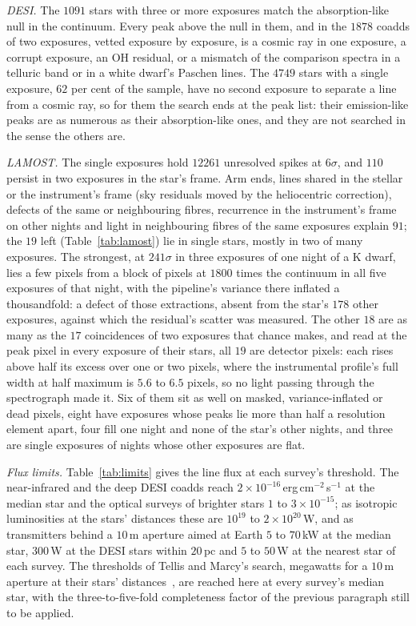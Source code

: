 \documentclass[3p,11pt]{elsarticle}
\begin{document}
\emph{DESI.} The $1091$ stars with three or more exposures match the absorption-like null
in the continuum. Every peak above the null in them, and in the $1878$ coadds of two
exposures, vetted exposure by exposure, is a cosmic ray in one exposure, a corrupt
exposure, an OH residual, or a mismatch of the comparison spectra in a telluric band or
in a white dwarf's Paschen lines. The $4749$ stars with a single exposure, $62$ per cent
of the sample, have no second exposure to separate a line from a cosmic ray, so for them
the search ends at the peak list: their emission-like peaks are as numerous as their
absorption-like ones, and they are not searched in the sense the others are.

\emph{LAMOST.} The single exposures hold $12261$ unresolved spikes at $6\sigma$, and $110$
persist in two exposures in the star's frame. Arm ends, lines shared in the stellar or
the instrument's frame (sky residuals moved by the heliocentric correction), defects of
the same or neighbouring fibres, recurrence in the instrument's frame on other nights and
light in neighbouring fibres of the same exposures explain $91$; the $19$ left
(Table~\ref{tab:lamost}) lie in single stars, mostly in two of many exposures. The
strongest, at $241\sigma$ in three exposures of one night of a K dwarf, lies a few
pixels from a block of pixels at $1800$ times the continuum in all five exposures of
that night, with the pipeline's variance there inflated a thousandfold: a defect of
those extractions, absent from the star's $178$ other exposures, against which the
residual's scatter was measured. The other $18$ are as many as the $17$ coincidences
of two exposures that chance makes, and read at the peak pixel in every exposure of
their stars, all $19$ are detector pixels: each rises above half its excess over one or
two pixels, where the instrumental profile's full width at half maximum is $5.6$ to
$6.5$ pixels, so no light passing through the spectrograph made it. Six of them sit as
well on masked, variance-inflated or dead pixels, eight have exposures whose peaks lie
more than half a resolution element apart, four fill one night and none of the star's
other nights, and three are single exposures of nights whose other exposures are flat.

\emph{Flux limits.} Table~\ref{tab:limits} gives the line flux at each survey's
threshold. The near-infrared and the deep DESI coadds reach $2\times10^{-16}$\,erg\,cm$^{-2}$\,s$^{-1}$
at the median star and the optical surveys of brighter stars $1$ to
$3\times10^{-15}$; as isotropic luminosities at the stars' distances these are $10^{19}$
to $2\times10^{20}$\,W, and as transmitters behind a $10$\,m aperture aimed at Earth
$5$ to $70$\,kW at the median star, $300$\,W at the DESI stars within $20$\,pc and $5$
to $50$\,W at the nearest star of each survey. The thresholds of Tellis and Marcy's
search, megawatts for a $10$\,m aperture at their stars' distances~\cite{TellisMarcy2017},
are reached here at every survey's median star, with the three-to-five-fold completeness
factor of the previous paragraph still to be applied.
\end{document}
